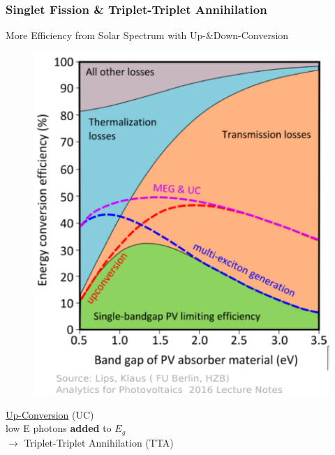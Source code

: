 \documentclass[compress]{beamer}
\begin{document}
\begin{frame}
  \frametitle{Singlet Fission \& Triplet-Triplet Annihilation}
More Efficiency from Solar Spectrum with Up-\&Down-Conversion\\
\small
\begin{multicols}{2}
\begin{figure}[H]
\includegraphics[width=1\columnwidth]{../img/SF_esq17.pdf}
\end{figure}
\columnbreak

\underline{Up-Conversion} (UC)\\
low E photons \textbf{added} to $E_g$\\
$\rightarrow$ Triplet-Triplet Annihilation (TTA)\\

\vspace{10pt}


\end{multicols}
\end{frame}
\end{document}
